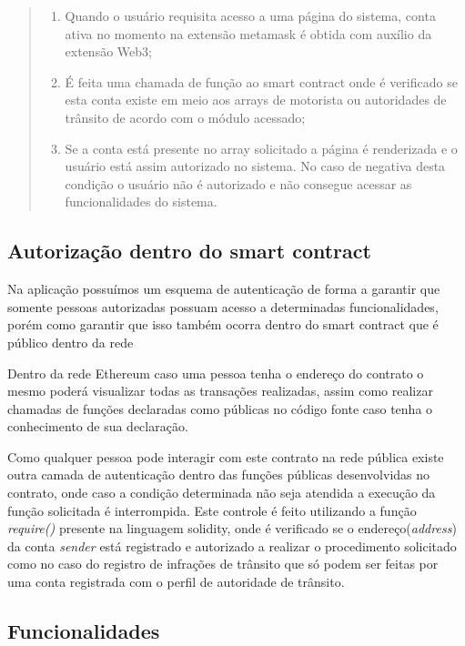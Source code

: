     \begin{quote}
        \begin{enumerate}
            \item Quando o usuário requisita acesso a uma página do sistema, conta ativa no momento na extensão metamask é obtida com auxílio da extensão Web3;
            \item É feita uma chamada de função ao smart contract onde é verificado se esta conta existe em meio aos arrays de motorista ou autoridades de trânsito de acordo com o módulo acessado;
            \item Se a conta está presente no array solicitado a página é renderizada e o usuário está assim autorizado no sistema. No caso de negativa desta condição o usuário não é autorizado e não consegue acessar as funcionalidades do sistema.
        \end{enumerate}
    \end{quote}

\subsection{Autorização dentro do smart contract}

Na aplicação possuímos um esquema de autenticação de forma a garantir que somente pessoas autorizadas possuam acesso a determinadas funcionalidades, porém como garantir que isso também ocorra dentro do smart contract que é público dentro da rede

Dentro da rede Ethereum caso uma pessoa tenha o endereço do contrato o mesmo poderá visualizar todas as transações realizadas, assim como realizar chamadas de funções declaradas como públicas no código fonte caso tenha o conhecimento de sua declaração.

Como qualquer pessoa pode interagir com este contrato na rede pública existe outra camada de autenticação dentro das funções públicas desenvolvidas no contrato, onde caso a condição determinada não seja atendida a execução da função solicitada é interrompida. Este controle é feito utilizando a função \textit{require()} presente na linguagem solidity, onde é verificado se o endereço(\textit{address}) da conta \textit{sender} está registrado e autorizado a realizar o procedimento solicitado como no caso do registro de infrações de trânsito que só podem ser feitas por uma conta registrada com o perfil de autoridade de trânsito.


\subsection{Funcionalidades}

